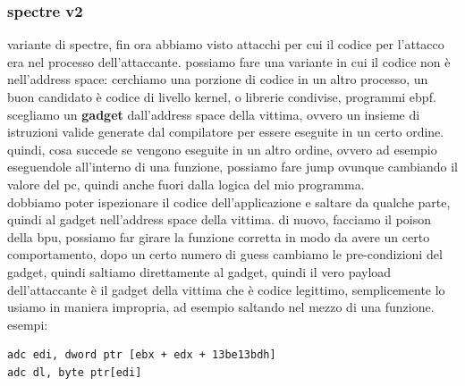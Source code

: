 \documentclass[12pt, oneside]{extbook} %
\begin{document}
\subsubsection{spectre v2}
variante di spectre, fin ora abbiamo visto attacchi per cui il codice per l'attacco era nel processo dell'attaccante. possiamo fare una variante in cui il codice non è nell'address space: cerchiamo una porzione di codice in un altro processo, un buon candidato è codice di livello kernel, o librerie condivise, programmi ebpf. scegliamo un \textbf{gadget} dall'address space della vittima, ovvero un insieme di istruzioni valide generate dal compilatore per essere eseguite in un certo ordine. quindi, cosa succede se vengono eseguite in un altro ordine, ovvero ad esempio eseguendole all'interno di una funzione, possiamo fare jump ovunque cambiando il valore del pc, quindi anche fuori dalla logica del mio programma.\\ dobbiamo poter ispezionare il codice dell'applicazione e saltare da qualche parte, quindi al gadget nell'address space della vittima. di nuovo, facciamo il poison della bpu, possiamo far girare la funzione corretta in modo da avere un certo comportamento, dopo un certo numero di guess cambiamo le pre-condizioni del gadget, quindi saltiamo direttamente al gadget, quindi il vero payload dell'attaccante è il gadget della vittima che è codice legittimo, semplicemente lo usiamo in maniera impropria, ad esempio saltando nel mezzo di una funzione.\\ esempi:
\begin{lstlisting}
adc edi, dword ptr [ebx + edx + 13be13bdh]
adc dl, byte ptr[edi]
\end{lstlisting}
\end{document}
